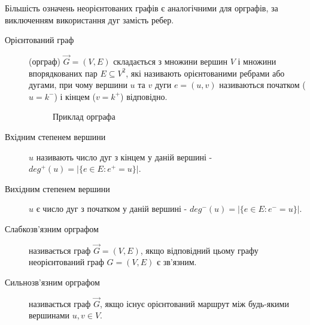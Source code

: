 
Більшість означень неорієнтованих графів є аналогічними для орграфів, за виключенням використання дуг замість ребер.

\begin{description}
  \item[Орієнтований граф] (орграф) $\overrightarrow G=(V,E)$ складається з множини вершин $V$ і множини впорядкованих пар $E \subseteq V^2$, які називають орієнтованими ребрами або дугами, при чому вершини $u$ та $v$ дуги $e=(u,v)$ називаються початком ($u=k^-$) і кінцем ($v=k^+$) відповідно.
    \begin{figure}[h]
      \centering
      
      \caption{Приклад орграфа}
      \label{fig:digraph}
    \end{figure}
  \item[Вхідним степенем вершини] $u$ називають число дуг з кінцем у даній вершині - $deg^+(u)=\vert\lbrace e \in E : e^+=u\rbrace \vert$.
  \item[Вихідним степенем вершини] $u$ є число дуг з початком у даній вершині - $deg^-(u)=\vert \lbrace e \in E : e^-=u \rbrace \vert$.
  \item[Слабкозв'язним орграфом] називається граф $\overrightarrow G=(V,E)$, якщо відповідний цьому графу неорієнтований граф $G=(V,E)$ є зв'язним.
  \item[Сильнозв'язним орграфом] називається граф $\overrightarrow G$, якщо існує орієнтований маршрут між будь-якими вершинами $u,v \in V$.
\end{description}
